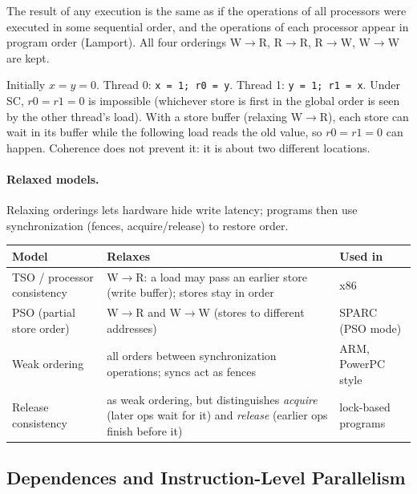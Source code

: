 \begin{definition}
The result of any execution is the same as if the operations of all processors were
executed in some sequential order, and the operations of each processor appear in
program order (Lamport). All four orderings W$\to$R, R$\to$R, R$\to$W, W$\to$W are
kept.
\end{definition}

\begin{eg}
Initially $x=y=0$. Thread 0: \texttt{x = 1; r0 = y}. Thread 1: \texttt{y = 1; r1 = x}.
Under SC, $r0=r1=0$ is impossible (whichever store is first in the global order is
seen by the other thread's load). With a store buffer (relaxing W$\to$R), each store
can wait in its buffer while the following load reads the old value, so $r0=r1=0$
can happen. Coherence does not prevent it: it is about two different locations.
\end{eg}

\paragraph{Relaxed models.} Relaxing orderings lets hardware hide write latency;
programs then use synchronization (fences, acquire/release) to restore order.
\begin{center}
\small
\begin{tabular}{@{}lP{5.8cm}P{4.4cm}@{}}
\toprule
Model & Relaxes & Used in \\
\midrule
TSO / processor consistency & W$\to$R: a load may pass an earlier store (write buffer); stores stay in order & x86 \\
PSO (partial store order) & W$\to$R and W$\to$W (stores to different addresses) & SPARC (PSO mode) \\
Weak ordering & all orders between synchronization operations; syncs act as fences & ARM, PowerPC style \\
Release consistency & as weak ordering, but distinguishes \emph{acquire} (later ops wait for it) and \emph{release} (earlier ops finish before it) & lock-based programs \\
\bottomrule
\end{tabular}
\end{center}

\subsection{Dependences and Instruction-Level Parallelism}
\label{sec:ilp}

